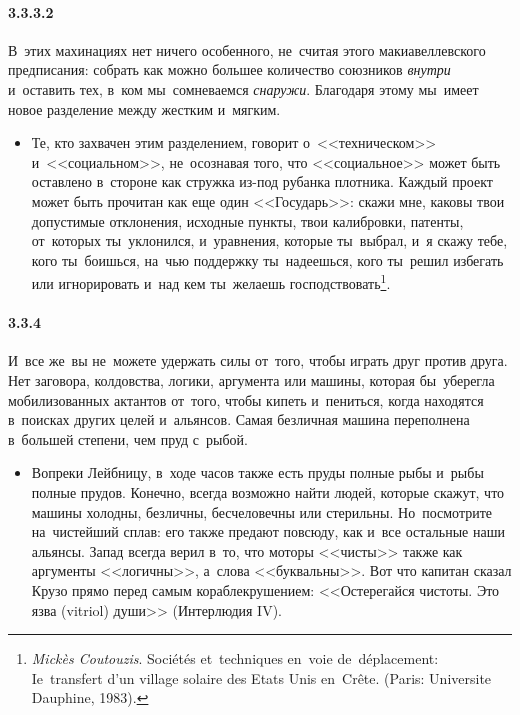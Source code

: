 \paragraph{3.3.3.2}\hypertarget{par:3.3.3.2}{} В~этих махинациях нет ничего особенного, не~считая этого макиавеллевского предписания: собрать как можно большее количество союзников {\itshape внутри} и~оставить тех, в~ком мы~сомневаемся {\itshape снаружи}. Благодаря этому мы~имеет новое разделение между жестким и~мягким.
	\begin{itemize}
	\item 
	Те, кто захвачен этим разделением, говорит о~<<техническом>> и~<<социальном>>, не~осознавая того, что <<социальное>> может быть оставлено в~стороне как стружка из-под рубанка плотника. Каждый проект может быть прочитан как еще один <<Государь>>: скажи мне, каковы твои допустимые отклонения, исходные пункты, твои калибровки, патенты, от~которых ты~уклонился, и~уравнения, которые ты~выбрал, и~я скажу тебе, кого ты~боишься, на~чью поддержку ты~надеешься, кого ты~решил избегать или игнорировать и~над кем ты~желаешь господствовать\footnote{{\itshape Mick{\`e}s Coutouzis}. Soci{\'e}t{\'e}s et~techniques en~voie de~d{\'e}placement: Ie~transfert d'un village solaire des Etats Unis en~Cr\^ete. (Paris: Universite Dauphine, 1983).}.
	\end{itemize}

\paragraph{3.3.4}\hypertarget{par:3.3.4}{} И~все же~вы не~можете удержать силы от~того, чтобы играть друг против друга. Нет заговора, колдовства, логики, аргумента или машины, которая бы~уберегла мобилизованных актантов от~того, чтобы кипеть и~пениться, когда находятся в~поисках других целей и~альянсов. Самая безличная машина переполнена в~большей степени, чем пруд с~рыбой.
	\begin{itemize}
	\item 
	Вопреки Лейбницу, в~ходе часов также есть пруды полные рыбы и~рыбы полные прудов. Конечно, всегда возможно найти людей, которые скажут, что машины холодны, безличны, бесчеловечны или стерильны. Но~посмотрите на~чистейший сплав: его также предают повсюду, как и~все остальные наши альянсы. Запад всегда верил в~то, что моторы <<чисты>> также как аргументы <<логичны>>, а~слова <<буквальны>>. Вот что капитан сказал Крузо прямо перед самым кораблекрушением: <<Остерегайся чистоты. Это язва (vitriol) души>> (Интерлюдия IV).
	\end{itemize}

